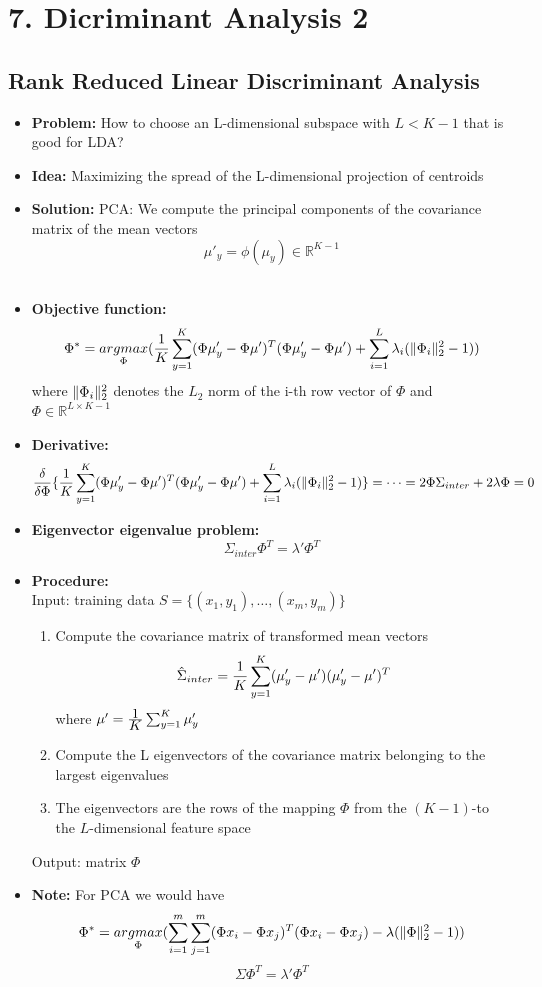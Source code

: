 \section*{7. Dicriminant Analysis 2}
\subsection*{Rank Reduced Linear Discriminant Analysis}
\begin{itemize}
    \item
        \textbf{Problem:} How to choose an L-dimensional subspace with $L < K - 1$ that is good for LDA?
    \item
        \textbf{Idea:} Maximizing the spread of the L-dimensional projection of centroids 
    \item
        \textbf{Solution:} PCA: We compute the principal components of the covariance matrix of the mean vectors
        $$\mu'_y = \phi(\mu_y) \in \mathbb{R}^{K-1}$$\\
    \item
        \textbf{Objective function:}
        $$\Phi^* = \underset{\Phi}{argmax}(\frac{\displaystyle 1}{\displaystyle K} \sum_{y=1}^{K}(\Phi \mu'_y - \Phi \mu')^T(\Phi \mu'_y - \Phi \mu') + \sum_{i=1}^{L} \lambda_i (\lVert\Phi_i\rVert_2^2 -1))$$ 
        where $\lVert\Phi_i\rVert_2^2$ denotes the $L_2$ norm of the i-th row vector of $\Phi$ and $\Phi \in \mathbb{R}^{L \times K-1}$
    \item
        \textbf{Derivative:}
        $$\frac{\displaystyle \delta}{\displaystyle \delta \Phi} \{\frac{\displaystyle 1}{\displaystyle K} \sum_{y=1}^{K}(\Phi \mu'_y - \Phi \mu')^T(\Phi \mu'_y - \Phi \mu') + \sum_{i=1}^{L} \lambda_i (\lVert\Phi_i\rVert_2^2 -1)\} = \dots = 2 \Phi \Sigma_{inter} + 2 \lambda \Phi = 0$$ 
    \item
        \textbf{Eigenvector eigenvalue problem:}
        $$\Sigma_{inter} \Phi^T = \lambda' \Phi^T$$ 
    \item
        \textbf{Procedure:}\\
        Input: training data $S = \{(x_1, y_1), \dots, (x_m, y_m)\}$
        \begin{enumerate}
            \item
                Compute the covariance matrix of transformed mean vectors
                $$\hat{\Sigma}_{inter} = \frac{\displaystyle 1}{\displaystyle K} \sum_{y=1}^K (\mu'_y - \mu')(\mu'_y - \mu')^T$$ 
                where $\mu' = \frac{\displaystyle 1}{\displaystyle K} \sum_{y=1}^{K} \mu'_y$
            \item
                Compute the L eigenvectors of the covariance matrix belonging to the largest eigenvalues
            \item
                The eigenvectors are the rows of the mapping $\Phi$ from the $(K-1)$-to the $L$-dimensional feature space
        \end{enumerate}
        Output: matrix $\Phi$
        \item
            \textbf{Note:} For PCA we would have
            $$\Phi^* = \underset{\Phi}{argmax}(\sum_{i=1}^{m} \sum_{j=1}^{m} (\Phi x_i - \Phi x_j)^T(\Phi x_i - \Phi x_j) - \lambda(\lVert\Phi\rVert_2^2-1))$$ 
            $$\Sigma \Phi^T = \lambda' \Phi^T$$

\end{itemize}
